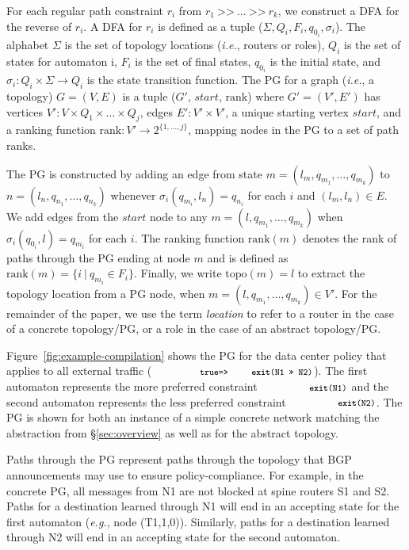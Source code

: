 \documentclass[numbers, 10pt, preprint]{sigplanconf}
\newcommand{\EG}{\emph{e.g.}}
\newcommand{\IE}{\emph{i.e.}}
\newcommand{\set}[1]{\ensuremath{\{ #1 \} }}
\newcommand{\CD}[1]{\texttt{\small #1}}
\newcommand{\KW}[1]{\texttt{\small\bfseries{#1}}}
\newcommand{\True}{\CD{true}}
\newcommand{\Prefer}{\texttt{>>}}
\newcommand{\Path}{\texttt{=>}}
\newcommand{\Exit}{\KW{exit}}
\newcommand{\Topo}[1]{\ensuremath{{\mathrm{topo}}(#1)}}
\newcommand{\Pref}{\ensuremath{\mathrm{rank}}}
\begin{document}
For each regular path constraint $r_i$ from $r_1 ~\Prefer~ ... ~\Prefer~ r_k$, we construct a DFA for the reverse of $r_i$. A DFA for $r_i$ is defined as a tuple ($\Sigma, Q_i, F_i, q_{0_i}, \sigma_i$). The alphabet $\Sigma$ is the set of topology locations (\IE, routers or roles), $Q_i$ is the set of states for automaton i, $F_i$ is the set of final states, $q_{0_i}$ is the initial state, and $\sigma_i \colon Q_i \times \Sigma \rightarrow Q_i$ is the state transition function.
%
The PG for a graph (\IE, a topology) $G=(V,E)$ is a tuple ($G'$, $start$, \Pref) where $G' = (V',E')$ has
vertices $V' \colon V \times Q_1 \times \dots \times Q_j$,
edges $E' \colon V' \times V'$,
a unique starting vertex $start$,
and a ranking function $\Pref \colon V' \rightarrow 2^{\set{1, \dots, j}}$, mapping nodes in the PG to a set of path ranks.

The PG is constructed by adding an edge from state $m = (l_m, q_{m_1}, \dots, q_{m_k})$ to $n = (l_n, q_{n_1}, \dots, q_{n_k})$ whenever $\sigma_i(q_{m_i}, l_n) = q_{n_i}$ for each $i$ and $(l_m,l_n) \in E$.
%
We add edges from the $\mathit{start}$ node to any $m = (l, q_{m_1}, \dots, q_{m_k})$ when $\sigma_i(q_{0_i}, l) = q_{m_i}$ for each $i$.
%
The ranking function $\Pref(m)$ denotes the rank of paths through the PG ending at node $m$ and is defined as $\Pref(m) = \set{i~\vert~q_{m_i} \in F_i}$.
%
Finally, we write $\Topo{m} = l$ to extract the topology location from a PG node, when $m = (l, q_{m_1}, \dots, q_{m_k}) \in V'$. For the remainder of the paper, we use the term \emph{location} to refer to a router in the case of a concrete topology/PG, or a role in the case of an abstract topology/PG.

Figure~\ref{fig:example-compilation} shows the PG for the data center policy that applies to all external traffic ($\CD{\True \Path \Exit(N1~\Prefer~N2)}$).
%
%
The first automaton represents the more preferred constraint $\CD{\Exit(N1)}$ and the second automaton represents the less preferred constraint $\CD{\Exit(N2)}$. The PG is shown for both an instance of a simple concrete network matching the abstraction from \S\ref{sec:overview} as well as for the abstract topology.

Paths through the PG represent paths through the topology that BGP announcements may use to ensure policy-compliance. For example, in the concrete PG, all messages from N1 are not blocked at spine routers S1 and S2. Paths for a destination learned through N1 will end in an accepting state for the first automaton (\EG, node (T1,1,0)). Similarly, paths for a destination learned through N2 will end in an accepting state for the second automaton.
\end{document}
